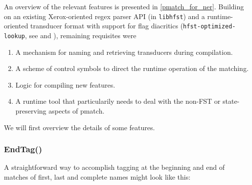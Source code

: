 \documentclass{llncs}
\begin{document}
An overview of the relevant features is presented in \ref{pmatch_for_ner}.
Building on an existing Xerox-oriented regex parser API (in \verb+libhfst+) and a
runtime-oriented transducer format with support for flag diacritics
(\verb+hfst-optimized-lookup+, see \cite{silfverberg/2009} and
\cite{hfst/2011}), remaining requisites were

\begin{enumerate}
\item A mechanism for naming and retrieving transducers during compilation.
\item A scheme of control symbols to direct the runtime operation of the matching.
\item Logic for compiling new features.
\item A runtime tool that particularily needs to deal with the non-FST or
state-preserving aspects of pmatch.
\end{enumerate}

We will first overview the details of some features.

\subsubsection{EndTag()}

A straightforward way to accomplish tagging at the beginning and end of matches
of first, last and complete names might look like this:

\end{document}
